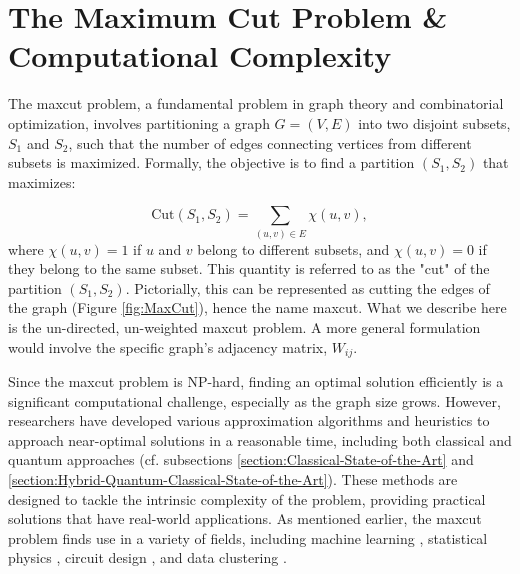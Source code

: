 

\section{The Maximum Cut Problem \& Computational Complexity}
\label{section:MaxCut_Comp._Complexity}

The \acrshort{maxcut} problem, a fundamental problem in graph theory and combinatorial optimization, involves partitioning a graph \( G = (V, E) \) into two disjoint subsets, \( S_1 \) and \( S_2 \), such that the number of edges connecting vertices from different subsets is maximized. Formally, the objective is to find a partition \( (S_1, S_2) \) that maximizes:

\begin{equation}\label{eq:Cut}
\text{Cut}(S_1, S_2) = \sum_{(u, v) \in E} \chi(u, v),
\end{equation}
where \( \chi(u, v) = 1 \) if \( u \) and \( v \) belong to different subsets, and \( \chi(u, v) = 0 \) if they belong to the same subset. This quantity is referred to as the "cut" of the partition $(S_1, S_2)$. Pictorially, this can be represented as cutting the edges of the graph (Figure \ref{fig:MaxCut}), hence the name \acrshort{maxcut}. What we describe here is the un-directed, un-weighted \acrshort{maxcut} problem. A more general formulation would involve the specific graph's adjacency matrix, $W_{ij}$.

Since the \acrshort{maxcut} problem is NP-hard, finding an optimal solution efficiently is a significant computational challenge, especially as the graph size grows. However, researchers have developed various approximation algorithms and heuristics to approach near-optimal solutions in a reasonable time, including both classical and quantum approaches (cf. subsections \ref{section:Classical-State-of-the-Art} and \ref{section:Hybrid-Quantum-Classical-State-of-the-Art}). These methods are designed to tackle the intrinsic complexity of the problem, providing practical solutions that have real-world applications. As mentioned earlier, the \acrshort{maxcut} problem finds use in a variety of fields, including machine learning \cite{937505}, statistical physics \cite{Barahona_Grötschel_Jünger_Reinelt_1988}, circuit design \cite{Barahona_Grötschel_Jünger_Reinelt_1988}, and data clustering \cite{10.1007/11893318_21}.

